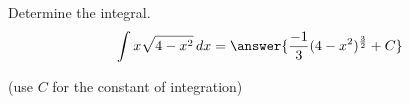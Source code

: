 \documentclass{ximera}
\author{Jason Miller}
\begin{document}
\begin{exercise}
Determine the integral.
\[
\int x\sqrt{4-x^{2}} \d x=\answer{ \frac{-1}{3}(4-x^{2})^{\frac{3}{2}}     +C   }
\]

(use $C$ for the constant of integration)


\end{exercise}
\end{document}
